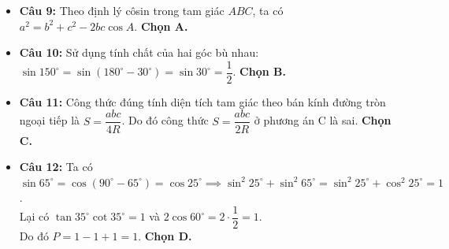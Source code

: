 \documentclass[12pt,a4paper]{article}
\begin{document}
\begin{itemize}[leftmargin=0.6cm]
    \item \textbf{Câu 9:} Theo định lý côsin trong tam giác $ABC$, ta có $a^2 = b^2 + c^2 - 2bc \cos A$. \textbf{Chọn A.}

    \item \textbf{Câu 10:} Sử dụng tính chất của hai góc bù nhau: $\sin 150^\circ = \sin(180^\circ - 30^\circ) = \sin 30^\circ = \dfrac{1}{2}$. \textbf{Chọn B.}

    \item \textbf{Câu 11:} Công thức đúng tính diện tích tam giác theo bán kính đường tròn ngoại tiếp là $S = \dfrac{abc}{4R}$. Do đó công thức $S = \dfrac{abc}{2R}$ ở phương án C là sai. \textbf{Chọn C.}

    \item \textbf{Câu 12:} Ta có $\sin 65^\circ = \cos(90^\circ - 65^\circ) = \cos 25^\circ \implies \sin^2 25^\circ + \sin^2 65^\circ = \sin^2 25^\circ + \cos^2 25^\circ = 1$.\\
    Lại có $\tan 35^\circ \cot 35^\circ = 1$ và $2\cos 60^\circ = 2 \cdot \dfrac{1}{2} = 1$.\\
    Do đó $P = 1 - 1 + 1 = 1$. \textbf{Chọn D.}
\end{itemize}
\end{document}
